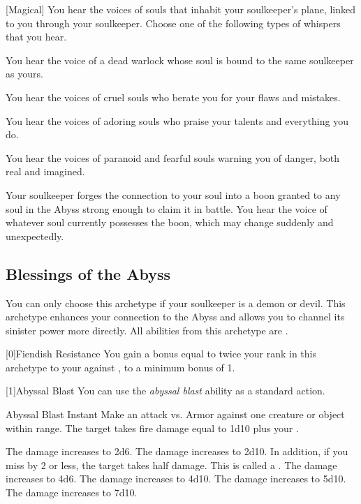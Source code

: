         [Magical]
        You hear the voices of souls that inhabit your soulkeeper's plane, linked to you through your soulkeeper.
        Choose one of the following types of whispers that you hear.
        {
             You hear the voice of a dead warlock whose soul is bound to the same soulkeeper as yours.

             You hear the voices of cruel souls who berate you for your flaws and mistakes.

             You hear the voices of adoring souls who praise your talents and everything you do.

             You hear the voices of paranoid and fearful souls warning you of danger, both real and imagined.

             Your soulkeeper forges the connection to your soul into a boon granted to any soul in the Abyss strong enough to claim it in battle.
            You hear the voice of whatever soul currently possesses the boon, which may change suddenly and unexpectedly.
        }

    \newpage
    \subsection{Blessings of the Abyss}
        You can only choose this archetype if your soulkeeper is a demon or devil.
        This archetype enhances your connection to the Abyss and allows you to channel its sinister power more directly.
        All abilities from this archetype are .

        [0]{Fiendish Resistance} You gain a bonus equal to twice your rank in this archetype to your  against , to a minimum bonus of 1.

        [1]{Abyssal Blast} You can use the \textit{abyssal blast} ability as a standard action.
        \begin{instantability}{Abyssal Blast}
            Instant
            \rankline
            Make an attack vs. Armor against one creature or object within \rngmed range.
            \hit The target takes fire damage equal to 1d10 plus your .

            \rankline
             The damage increases to 2d6.
             The damage increases to 2d10.
                In addition, if you miss by 2 or less, the target takes half damage.
                This is called a .
             The damage increases to 4d6.
             The damage increases to 4d10.
             The damage increases to 5d10.
             The damage increases to 7d10.
        \end{instantability}


